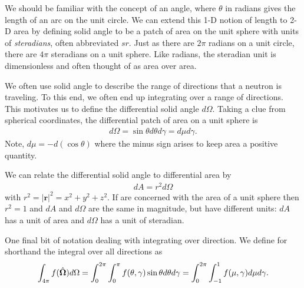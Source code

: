 We should be familiar with the concept of an angle, where $\theta$ in radians gives the length of an arc on the unit circle. We can extend this 1-D notion of length to 2-D area by defining solid angle to be a patch of area on the unit sphere with units of \emph{steradians}, often abbreviated $sr$. Just as there are $2\pi$ radians on a unit circle, there are $4\pi$ steradians on a unit sphere. Like radians, the steradian unit is dimensionless and often thought of as area over area.

We often use solid angle to describe the range of directions that a neutron is traveling. To this end, we often end up integrating over a range of directions. This motivates us to define the differential solid angle $d\Omega$. Taking a clue from spherical coordinates, the differential patch of area on a unit sphere is
\begin{align}
  d\Omega = \sin\theta d\theta d\gamma = d\mu d\gamma .
\end{align}
Note, $d\mu = -d(\cos\theta)$ where the minus sign arises to keep area a positive quantity.

We can relate the differential solid angle to differential area by
\begin{align}
  dA = r^2 d\Omega 
\end{align}
with $r^2 = |\mathbf{r}|^2 = x^2 + y^2 + z^2$. If are concerned with the area of a unit sphere then $r^2 = 1$ and $dA$ and $d\Omega$ are the same in magnitude, but have different units: $dA$ has a unit of area and $d\Omega$ has a unit of steradian.

One final bit of notation dealing with integrating over direction. We define for shorthand the integral over all directions as
\begin{align}
  \int_{4\pi} f(\hat{\mathbf{\Omega}}) d\Omega = \int_0^{2\pi} \int_0^\pi f(\theta,\gamma) \sin\theta d\theta d\gamma = \int_0^{2\pi} \int_{-1}^1 f(\mu,\gamma) d\mu d\gamma .
\end{align}




%
%


